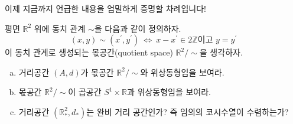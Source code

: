 \documentclass[serif]{beamer}
\begin{document}
\begin{frame}
    이제 지금까지 언급한 내용을 엄밀하게 증명할 차례입니다!
    \begin{prob*}{}
        평면 $\mathbb R^2$ 위에 동치 관계 $\sim$을 다음과 같이 정의하자.
        \[
            (x,y)\sim(x^\prime,y^\prime)~\Longleftrightarrow~x-x^\prime\in 2\mathbb Z\text{이고 } y=y^\prime
        \]
        이 동치 관계로 생성되는 몫공간(quotient space) $\mathbb R^2/\sim$을 생각하자.
        \begin{enumerate}[(a)]
            \item 거리공간 $(A,d)$가 몫공간 $\mathbb R^2/\sim$와 위상동형임을 보여라.
            \item 몫공간 $\mathbb R^2/\sim$이 곱공간 $S^1\times\mathbb R$과 위상동형임을 보여라.
            \item 거리공간 $(\mathbb R^2_*,d_*)$는 완비 거리 공간인가? 즉 임의의 코시수열이 수렴하는가?
        \end{enumerate}
    \end{prob*}
\end{frame}
\end{document}
